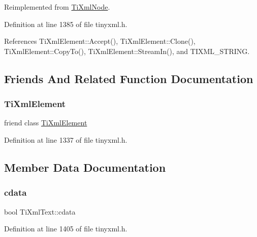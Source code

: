 Reimplemented from \hyperlink{class_ti_xml_node_a3ddfbcac78fbea041fad57e5c6d60a03}{Ti\+Xml\+Node}.



Definition at line 1385 of file tinyxml.\+h.



References Ti\+Xml\+Element\+::\+Accept(), Ti\+Xml\+Element\+::\+Clone(), Ti\+Xml\+Element\+::\+Copy\+To(), Ti\+Xml\+Element\+::\+Stream\+In(), and T\+I\+X\+M\+L\+\_\+\+S\+T\+R\+I\+NG.



\subsection{Friends And Related Function Documentation}
\hypertarget{class_ti_xml_text_ab6592e32cb9132be517cc12a70564c4b}{}\label{class_ti_xml_text_ab6592e32cb9132be517cc12a70564c4b} 
\subsubsection{\texorpdfstring{Ti\+Xml\+Element}{TiXmlElement}}
{\footnotesize\ttfamily friend class \hyperlink{class_ti_xml_element}{Ti\+Xml\+Element}\hspace{0.3cm}{\ttfamily [friend]}}



Definition at line 1337 of file tinyxml.\+h.



\subsection{Member Data Documentation}
\hypertarget{class_ti_xml_text_a1919a0467daf2cf5d099b225add5b9f1}{}\label{class_ti_xml_text_a1919a0467daf2cf5d099b225add5b9f1} 
\subsubsection{\texorpdfstring{cdata}{cdata}}
{\footnotesize\ttfamily bool Ti\+Xml\+Text\+::cdata\hspace{0.3cm}{\ttfamily [private]}}



Definition at line 1405 of file tinyxml.\+h.



